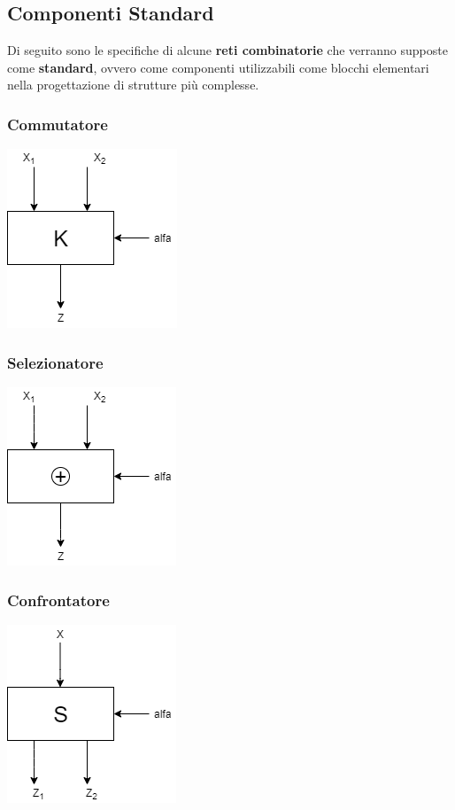 \documentclass[10pt]{report}
\begin{document}
\subsection{Componenti Standard}
Di seguito sono le specifiche di alcune \textbf{reti combinatorie} che verranno supposte come \textbf{standard}, ovvero come componenti utilizzabili come blocchi elementari nella progettazione di strutture più complesse.
\subsubsection{Commutatore}
	\includegraphics[scale=0.7]{commutatore.png}
\subsubsection{Selezionatore}
	\includegraphics[scale=0.7]{confrontatore.png}
\subsubsection{Confrontatore}
	\includegraphics[scale=0.7]{selezionatore.png}
\end{document}
